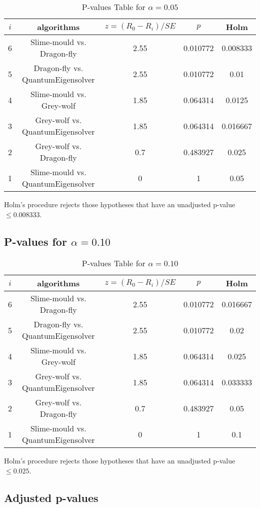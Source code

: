 \documentclass[a4paper,10pt]{article}
\begin{document}
\begin{landscape}
\begin{table}[!htp]
\centering\scriptsize
\begin{tabular}{ccccc}
$i$&algorithms&$z=(R_0 - R_i)/SE$&$p$&Holm\\
\hline6&Slime-mould vs. Dragon-fly&2.55&0.010772&0.008333\\
5&Dragon-fly vs. QuantumEigensolver&2.55&0.010772&0.01\\
4&Slime-mould vs. Grey-wolf&1.85&0.064314&0.0125\\
3&Grey-wolf vs. QuantumEigensolver&1.85&0.064314&0.016667\\
2&Grey-wolf vs. Dragon-fly&0.7&0.483927&0.025\\
1&Slime-mould vs. QuantumEigensolver&0&1&0.05\\
\hline
\end{tabular}
\caption{P-values Table for $\alpha=0.05$}
\end{table}Holm's procedure rejects those hypotheses that have an unadjusted p-value $\le0.008333$.

\pagebreak

\subsection{P-values for $\alpha=0.10$}

\begin{table}[!htp]
\centering\scriptsize
\begin{tabular}{ccccc}
$i$&algorithms&$z=(R_0 - R_i)/SE$&$p$&Holm\\
\hline6&Slime-mould vs. Dragon-fly&2.55&0.010772&0.016667\\
5&Dragon-fly vs. QuantumEigensolver&2.55&0.010772&0.02\\
4&Slime-mould vs. Grey-wolf&1.85&0.064314&0.025\\
3&Grey-wolf vs. QuantumEigensolver&1.85&0.064314&0.033333\\
2&Grey-wolf vs. Dragon-fly&0.7&0.483927&0.05\\
1&Slime-mould vs. QuantumEigensolver&0&1&0.1\\
\hline
\end{tabular}
\caption{P-values Table for $\alpha=0.10$}
\end{table}Holm's procedure rejects those hypotheses that have an unadjusted p-value $\le0.025$.

\pagebreak

\subsection{Adjusted p-values}


\end{landscape}
\end{document}
